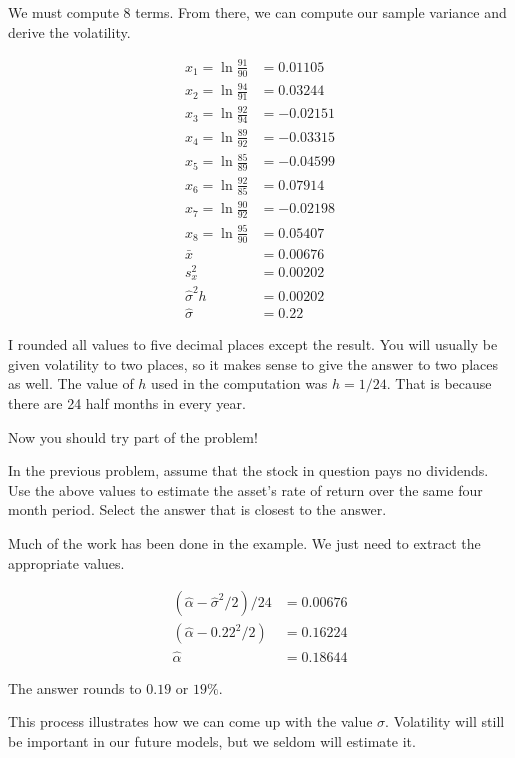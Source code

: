 \documentclass{ximera}
\begin{document}
\begin{solution}
We must compute 8 terms. From there, we can compute our sample variance and derive the volatility.

	\begin{align*}
	x_1=\ln\frac{91}{90}	&=0.01105\\
	x_2=\ln\frac{94}{91}	&=0.03244\\
	x_3=\ln\frac{92}{94}	&=-0.02151\\
	x_4=\ln\frac{89}{92}	&=-0.03315\\
	x_5=\ln\frac{85}{89}	&=-0.04599\\
	x_6=\ln\frac{92}{85}	&=0.07914\\
	x_7=\ln\frac{90}{92}	&=-0.02198\\
	x_8=\ln\frac{95}{90}	&=0.05407\\
	\bar{x}			&=0.00676\\
	s_x^2				&=0.00202\\
	\hat{\sigma}^2h 		&=0.00202\\
	\hat{\sigma} 		&=0.22
	\end{align*}

I rounded all values to five decimal places except the result. You will usually be given volatility to two places, so it makes sense to give the answer to two places as well. The value of $h$ used in the computation was $h=1/24$. That is because there are 24 half months in every year.
\end{solution}

Now you should try part of the problem!

\begin{question}
In the previous problem, assume that the stock in question pays no dividends. Use the above values to estimate the asset's rate of return over the same four month period. Select the answer that is closest to the answer.

	\begin{multipleChoice}
	\end{multipleChoice}
\end{question}

\begin{solution}
Much of the work has been done in the example. We just need to extract the appropriate values.

	\begin{align*}
	(\hat{\alpha}-\hat{\sigma}^2/2)/24 	&=0.00676\\
	(\hat{\alpha}-0.22^2/2) 			&=0.16224\\
	\hat{\alpha} 					&=0.18644
	\end{align*}

The answer rounds to $0.19$ or $19\%$.
\end{solution}

This process illustrates how we can come up with the value $\sigma$. Volatility will still be important in our future models, but we seldom will estimate it.
\end{document}
